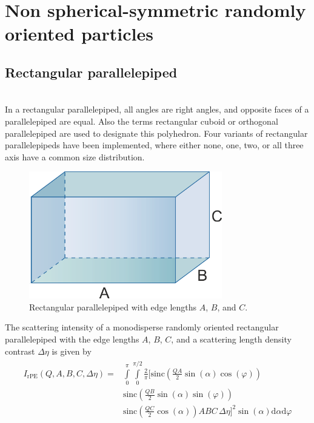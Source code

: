 
\section{Non spherical-symmetric randomly oriented particles}
\label{sec:anisotropic_randomlyoriented_particles}
\subsection{Rectangular parallelepiped}~\\
\label{sec:reccuboid}
In a rectangular parallelepiped, all angles are right angles, and opposite faces of a parallelepiped are equal. Also the terms rectangular cuboid or orthogonal parallelepiped are used to designate this polyhedron. Four variants of rectangular parallelepipeds have been implemented, where either none, one, two, or all three axis have a common size distribution.
\begin{figure}[htb]
\begin{center}
\includegraphics[width=0.75\textwidth]{../images/form_factor/anisotropic/rectangularparallelepiped.png}
\end{center}
\caption{Rectangular parallelepiped with edge lengths $A$, $B$, and $C$.}
\label{fig:recparallelepiped}
\end{figure}
The scattering intensity of a monodisperse randomly oriented rectangular parallelepiped with the edge lengths $A$, $B$, $C$, and a scattering length density contrast $\Delta\eta$ is given by
\begin{align}
\begin{split}
I_\text{rPE}(Q,A,B,C,\Delta\eta) = & \int\limits_0^\pi\int\limits_0^{\pi/2}
\frac{2}{\pi} \Bigg[ \textrm{sinc}\left(\frac{QA}{2} \sin(\alpha) \cos(\varphi)\right)  \\
				     &\textrm{sinc}\left(\frac{QB}{2} \sin(\alpha) \sin(\varphi)\right) \\
		             &\textrm{sinc}\left(\frac{QC}{2} \cos(\alpha)\right) ABC\, \Delta\eta \Bigg]^2  \sin\left(\alpha\right) \mathrm{d}\alpha \mathrm{d}\varphi
\end{split}
\end{align}
